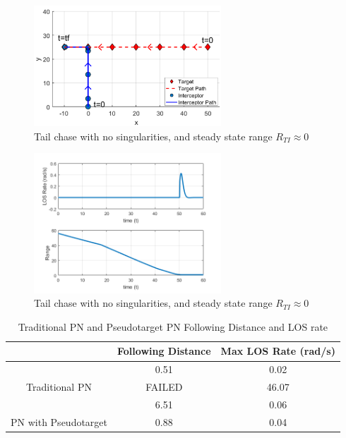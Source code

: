 \documentclass[conference]{IEEEtran}
\begin{document}
\begin{figure}[H]
	\centering
	\includegraphics[width=7cm] {fixedSingularity}
	\caption{Tail chase with no singularities, and steady state range $R_{TI}\approx0$}
	\label{fig:modifiedPNsuccess}
	\hspace*{0mm}
\end{figure}

\begin{figure}[H]
	\centering
	\includegraphics[width=7cm] {ptx50_range_LOSrate}
	\caption{Tail chase with no singularities, and steady state range $R_{TI}\approx0$}
	\label{fig:modifiedPNsuccessLOS}
	\hspace*{0mm}
\end{figure}



\begin{table}[H]
	\centering
	\caption{Traditional PN and Pseudotarget PN Following Distance and LOS rate}
	\label{my-label}
	\begin{tabular}{c|c|c|}
		\cline{2-3}
		\multicolumn{1}{l|}{}                                        & \multicolumn{1}{l|}{Following Distance} & \multicolumn{1}{l|}{Max LOS Rate (rad/s)} \\ \hline
		\multicolumn{1}{|c|}{}                                       & 0.51                                    & 0.02                                      \\ \cline{2-3} 
		\multicolumn{1}{|c|}{\multirow{-2}{*}{Traditional PN}}       & \cellcolor[HTML]{C0C0C0} FAILED         & 46.07                                     \\ \hline
		\multicolumn{1}{|c|}{}                                       & 6.51                                    & 0.06                                      \\ \cline{2-3} 
		\multicolumn{1}{|c|}{\multirow{-2}{*}{PN with Pseudotarget}} & 0.88                                    & 0.04                                      \\ \hline
	\end{tabular}
\end{table}
\end{document}
